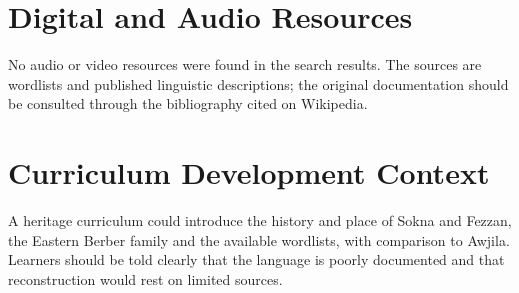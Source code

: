 \documentclass[12pt]{article}
\begin{document}
\section{Digital and Audio Resources}
No audio or video resources were found in the search results. The sources are wordlists and published linguistic descriptions; the original documentation should be consulted through the bibliography cited on Wikipedia.

\section{Curriculum Development Context}
A heritage curriculum could introduce the history and place of Sokna and Fezzan, the Eastern Berber family and the available wordlists, with comparison to Awjila. Learners should be told clearly that the language is poorly documented and that reconstruction would rest on limited sources.
\end{document}
